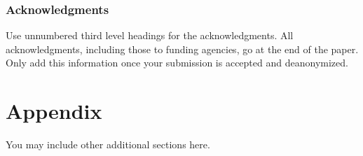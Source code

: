 \documentclass[10pt]{article} %
\begin{document}
\subsubsection*{Acknowledgments}
Use unnumbered third level headings for the acknowledgments. All
acknowledgments, including those to funding agencies, go at the end of the paper.
Only add this information once your submission is accepted and deanonymized. 




\appendix
\section{Appendix}
You may include other additional sections here.
\end{document}
